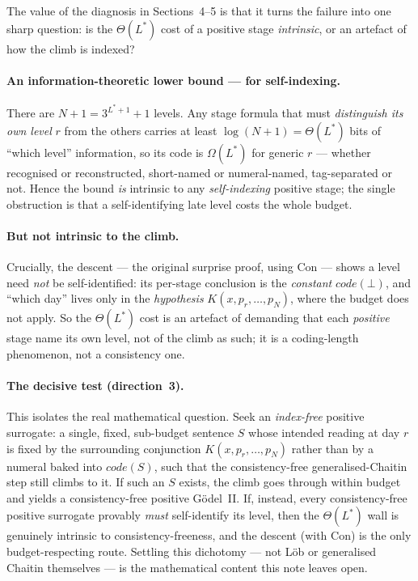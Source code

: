 \documentclass[11pt]{article}
\theoremstyle{plain}
\theoremstyle{definition}
\theoremstyle{remark}
\newcommand{\code}[1]{\mathit{code}(#1)}
\newcommand{\Lstar}{L^{*}}
\begin{document}
The value of the diagnosis in Sections~4--5 is that it turns the failure into one
sharp question: is the $\Theta(\Lstar)$ cost of a positive stage \emph{intrinsic},
or an artefact of how the climb is indexed?

\paragraph{An information-theoretic lower bound --- for self-indexing.}
There are $N{+}1=3^{\Lstar+1}{+}1$ levels. Any stage formula that must
\emph{distinguish its own level} $r$ from the others carries at least
$\log(N{+}1)=\Theta(\Lstar)$ bits of ``which level'' information, so its code is
$\Omega(\Lstar)$ for generic $r$ --- whether recognised or reconstructed,
short-named or numeral-named, tag-separated or not. Hence the bound \emph{is}
intrinsic to any \emph{self-indexing} positive stage; the single obstruction is
that a self-identifying late level costs the whole budget.

\paragraph{But not intrinsic to the climb.}
Crucially, the descent --- the original surprise proof, using $\mathrm{Con}$ ---
shows a level need \emph{not} be self-identified: its per-stage conclusion is the
\emph{constant} $\code{\bot}$, and ``which day'' lives only in the
\emph{hypothesis} $K(x,p_r,\dots,p_N)$, where the budget does not apply. So the
$\Theta(\Lstar)$ cost is an artefact of demanding that each \emph{positive} stage
name its own level, not of the climb as such; it is a coding-length phenomenon,
not a consistency one.

\paragraph{The decisive test (direction~3).}
This isolates the real mathematical question. Seek an \emph{index-free} positive
surrogate: a single, fixed, sub-budget sentence $S$ whose intended reading at day
$r$ is fixed by the surrounding conjunction $K(x,p_r,\dots,p_N)$ rather than by a
numeral baked into $\code{S}$, such that the consistency-free generalised-Chaitin
step still climbs to it. If such an $S$ exists, the climb goes through within
budget and yields a consistency-free positive G\"odel~II. If, instead, every
consistency-free positive surrogate provably \emph{must} self-identify its level,
then the $\Theta(\Lstar)$ wall is genuinely intrinsic to consistency-freeness, and
the descent (with $\mathrm{Con}$) is the only budget-respecting route. Settling
this dichotomy --- not L\"ob or generalised Chaitin themselves --- is the
mathematical content this note leaves open.
\end{document}
